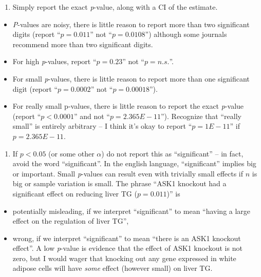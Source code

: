\documentclass[]{book}
\providecommand{\tightlist}{%
  \setlength{\itemsep}{0pt}\setlength{\parskip}{0pt}}
\begin{document}
\begin{enumerate}
\def\labelenumi{\arabic{enumi}.}
\tightlist
\item
  Simply report the exact \emph{p}-value, along with a CI of the estimate.
\end{enumerate}

\begin{itemize}
\tightlist
\item
  \emph{P}-values are noisy, there is little reason to report more than two significant digits (report ``\(p = 0.011\)'' not ``\(p = 0.0108\)'') although some journals recommend more than two significant digits.
\item
  For high \emph{p}-values, report ``\(p = 0.23\)'' not ``\(p = n.s.\)''.
\item
  For small \emph{p}-values, there is little reason to report more than one significant digit (report ``\(p = 0.0002\)'' not ``\(p = 0.00018\)'').
\item
  For really small p-values, there is little reason to report the exact \emph{p}-value (report ``\(p < 0.0001\)'' and not ``\(p = 2.365E-11\)''). Recognize that ``really small'' is entirely arbitrary -- I think it's okay to report ``\(p = 1E-11\)'' if \(p = 2.365E-11\).
\end{itemize}

\begin{enumerate}
\def\labelenumi{\arabic{enumi}.}
\setcounter{enumi}{1}
\tightlist
\item
  If \(p < 0.05\) (or some other \(\alpha\)) do not report this as ``significant'' -- in fact, avoid the word ``significant''. In the english language, ``significant'' implies big or important. Small \emph{p}-values can result even with trivially small effects if \(n\) is big or sample variation is small. The phrase ``ASK1 knockout had a significant effect on reducing liver TG (\(p = 0.011\))'' is
\end{enumerate}

\begin{itemize}
\tightlist
\item
  potentially misleading, if we interpret ``significant'' to mean ``having a large effect on the regulation of liver TG'',
\item
  wrong, if we interpret ``significant'' to mean ``there is an ASK1 knockout effect''.
  A low \emph{p}-value is evidence that the effect of ASK1 knockout is not zero, but I would wager that knocking out any gene expressed in white adipose cells will have \emph{some} effect (however small) on liver TG.
\end{itemize}
\end{document}
